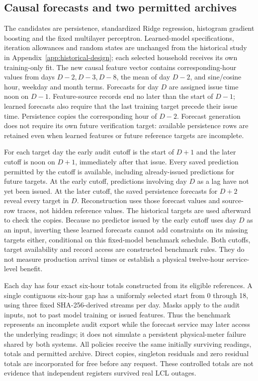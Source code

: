 \documentclass[12pt]{article}
\begin{document}
\subsection{Causal forecasts and two permitted archives}\label{sec:external-archive}
The candidates are persistence, standardized Ridge regression, histogram
gradient boosting and the fixed multilayer perceptron. Learned-model
specifications, iteration allowances and random states are unchanged from
the historical study in Appendix~\ref{app:historical-design}; each selected
household receives its own training-only fit. The new causal feature vector
contains corresponding-hour values from days $D-2,D-3,D-8$, the mean of day
$D-2$, and sine/cosine hour, weekday and month terms. Forecasts for day $D$
are assigned issue time noon on $D-1$. Feature-source records end no later
than the start of $D-1$; learned forecasts also require that the last
training target precede their issue time. Persistence copies the
corresponding hour of $D-2$. Forecast generation does not require its own
future verification target: available persistence rows are retained even
when learned features or future reference targets are incomplete.

For each target day the early audit cutoff is the start of $D+1$ and the
later cutoff is noon on $D+1$, immediately after that issue. Every saved
prediction permitted by the cutoff is available, including already-issued
predictions for future targets. At the early cutoff, predictions involving
day $D$ as a lag have not yet been issued. At the later cutoff, the saved
persistence forecasts for $D+2$ reveal every target in $D$. Reconstruction
uses those forecast values and source-row traces, not hidden reference
values. The historical targets are used afterward to check the copies.
Because no predictor issued by the early cutoff uses day $D$ as an input,
inverting these learned forecasts cannot add constraints on its missing
targets either, conditional on this fixed-model benchmark schedule.
Both cutoffs, target availability and record access are constructed
benchmark rules. They do not measure production arrival times or establish
a physical twelve-hour service-level benefit.

Each day has four exact six-hour totals constructed from its eligible
references. A single contiguous six-hour gap has a uniformly selected start
from 0 through 18, using three fixed SHA-256-derived streams per day. Masks
apply to the audit inputs, not to past model training or issued features.
Thus the benchmark represents an incomplete audit export while the forecast
service may later access the underlying readings; it does not simulate a
persistent physical-meter failure shared by both systems.
All policies receive the same initially surviving readings, totals and
permitted archive. Direct copies, singleton residuals and zero residual
totals are incorporated for free before any request. These controlled totals
are not evidence that independent registers survived real LCL outages.
\end{document}
